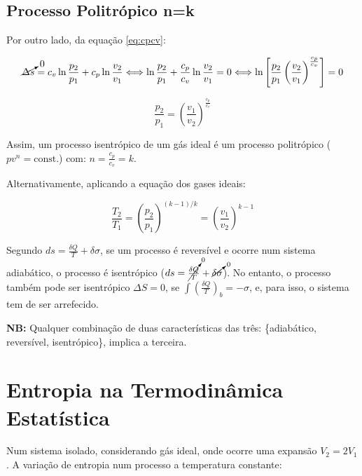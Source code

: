 \subsection{Processo Politrópico n=k}

Por outro lado, da equação \ref{eq:cpcv}:

\begin{equation}
    \cancelto{0}{\Delta s} = c_v \ln \frac{p_2}{p_1} + c_p \ln \frac{v_2}{v_1} \Longleftrightarrow \ln \frac{p_2}{p_1} + \frac{c_p}{c_v} \ln \frac{v_2}{v_1} = 0 \Longleftrightarrow \ln \left[ \frac{p_2}{p_1} \left( \frac{v_2}{v_1} \right)^{\frac{c_p}{c_v}} \right] = 0
\end{equation}

\begin{equation}
    \frac{p_2}{p_1} = \left( \frac{v_1}{v_2} \right)^{\frac{c_p}{c_v}}
\end{equation}

Assim, um processo isentrópico de um gás ideal é um processo politrópico ($pv^n = \text{const.}$) com: $n = \frac{c_p}{c_v} = k$.

Alternativamente, aplicando a equação dos gases ideais:

\begin{equation}
    \frac{T_2}{T_1} = \left( \frac{p_2}{p_1} \right)^{(k-1)/k} = \left( \frac{v_1}{v_2} \right)^{k-1}
\end{equation}

Segundo $ds = \frac{\delta Q}{T} + \delta \sigma$, se um processo é reversível e ocorre num sistema adiabático, o processo é isentrópico ($ds = \cancelto{0}{\frac{\delta Q}{T}} + \cancelto{0}{\delta \sigma}$). No entanto, o processo também pode ser isentrópico $\Delta S = 0$, se $\int \left( \frac{\delta Q}{T} \right)_b = - \sigma$, e, para isso, o sistema tem de ser arrefecido.

\textbf{NB:} Qualquer combinação de duas características das três: \{adiabático, reversível, isentrópico\}, implica a terceira.





\section{Entropia na Termodinâmica Estatística}

Num sistema isolado, considerando gás ideal, onde ocorre uma expansão $V_2 = 2 V_1$. A variação de entropia num processo a temperatura constante:

